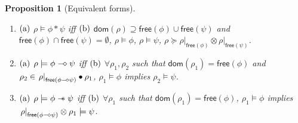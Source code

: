 \documentclass[conference,compsoc, 10pt]{IEEEtran}
\newtheorem{proposition}{Proposition}[section]
\newcommand {\Ldom }[1] {{\mathsf{dom}\!\left(#1\right)}}
\newcommand {\Lfree }[1] {{\mathsf{free}{\left(#1\right)}}}
\newcommand {\rt }[2] {{\left.{#1}\right|_{#2}}}
\newcommand {\sepimp} {\mathrel{-\mkern-6mu*}}
\newcommand {\sdimp} {\mathrel{-\mkern-2.5mu\diamond}}
\begin{document}
\begin{appendices}
\begin{proposition}[Equivalent forms]
\begin{enumerate}
				${\rm (b)}$ $\Ldom{\rho}\supseteq \Lfree{\phi}\cup\Lfree{\psi}$ and exists disjoint $S_1,S_2\subseteq\Ldom{\rho}$ such that $\rt{\rho}{S_1}\models\phi$ and $\rt{\rho}{S_2}\models\psi$ iff 
				
				${\rm (c)}$ $\Ldom{\rho}\supseteq \Lfree{\phi}\cup\Lfree{\psi}$ and $\Lfree{\phi}\cap\Lfree{\psi} = \emptyset$, $\rho\models\phi$, $\rho\models\psi$.
				
				\item[${\rm 2.}$] ${\rm (a)}$ $\rho\models\phi\ast\psi$ iff
				${\rm (b)}$ $\Ldom{\rho}\supseteq \Lfree{\phi}\cup\Lfree{\psi}$ and $\Lfree{\phi}\cap\Lfree{\psi} = \emptyset$, $\rho\models\phi$, $\rho\models\psi$, $\rho\succeq\rt{\rho}{\Lfree{\phi}}\otimes\rt{\rho}{\Lfree{\psi}}$.
				
				\item[${\rm 3.}$] ${\rm (a)}$ $\rho\models\phi\sdimp\psi$ iff
				${\rm (b)}$ $\forall \rho_1,\rho_2$ such that $\Ldom{\rho_1} = \Lfree{\phi}$ and $\rho_2\in\rt{\rho}{\Lfree{\phi\sdimp\psi}}\bullet\rho_1$, $\rho_1\models\phi$ implies $\rho_2\models\psi$.
				
				\item[${\rm 4.}$] ${\rm (a)}$ $\rho\models\phi\sepimp\psi$ iff
				${\rm (b)}$ $\forall \rho_1$ such that $\Ldom{\rho_1} = \Lfree{\phi}$, $\rho_1\models\phi$ implies $\rt{\rho}{\Lfree{\phi\sdimp\psi}}\otimes\rho_1\models\psi$.
				

\end{enumerate}
\end{proposition}
\end{appendices}
\end{document}
